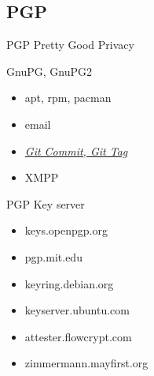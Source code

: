 \documentclass[UTF8]{ctexbeamer}
\begin{document}
\subsection{PGP}
\begin{frame}{PGP}
    Pretty Good Privacy
    
    GnuPG, GnuPG2
    
    \begin{itemize}
        \item apt, rpm, pacman
        \item email
        \item \textit{\href{https://docs.github.com/en/github/authenticating-to-github/managing-commit-signature-verification}{Git Commit, Git Tag}}
        \item XMPP
    \end{itemize}
\end{frame}

\begin{frame}{PGP}
    Key server

    \vspace{1em}
    
    \begin{itemize}
        \item keys.openpgp.org
        \item pgp.mit.edu
        \item keyring.debian.org
        \item keyserver.ubuntu.com
        \item attester.flowcrypt.com
        \item zimmermann.mayfirst.org
    \end{itemize}
    
\end{frame}
\end{document}
